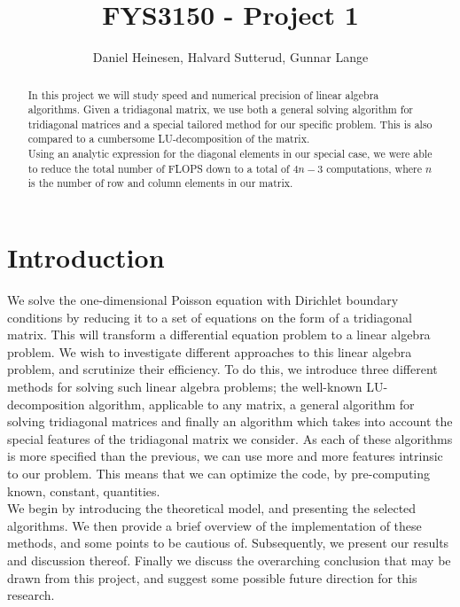 \documentclass[a4paper, 10pt]{article}
\title{FYS3150 - Project 1}
\author{Daniel Heinesen, Halvard Sutterud, Gunnar Lange}
\begin{document}
\maketitle
\begin{abstract}In this project we will study speed and numerical precision of
    linear algebra algorithms. Given a tridiagonal matrix, we use both a
    general solving algorithm for tridiagonal matrices and a special
    tailored method for our specific problem. This is also
    compared to a cumbersome LU-decomposition of the matrix.\\
    \linebreak
    Using an analytic expression for the diagonal elements in our special
    case, we were able to reduce the total number of FLOPS down to a total
    of $4n-3$ computations, where $n$ is the number of row and column
    elements in our matrix. 

    

\end{abstract}
\tableofcontents



\section{Introduction }
We solve the one-dimensional Poisson equation with Dirichlet boundary conditions by reducing it to a set of equations on the form of a tridiagonal matrix. This will transform a differential equation problem to a linear algebra problem. We wish to investigate different approaches to this linear algebra problem, and scrutinize their efficiency. To do this, we introduce three different methods for solving such linear algebra problems; the well-known LU-decomposition algorithm, applicable to any matrix, a general algorithm for solving tridiagonal matrices and finally an algorithm which takes into account the special features of the tridiagonal matrix we consider. As each of these algorithms is more specified than the previous, we can use more and more features intrinsic to our problem. This means that we can optimize the code, by pre-computing known, constant, quantities.\\
\linebreak
We begin by introducing the theoretical model, and presenting the selected algorithms. We then provide a brief overview of the implementation of these methods, and some points to be cautious of. Subsequently, we present our results and discussion thereof. Finally we discuss the overarching conclusion that may be drawn from this project, and suggest some possible future direction for this research.
\end{document}

